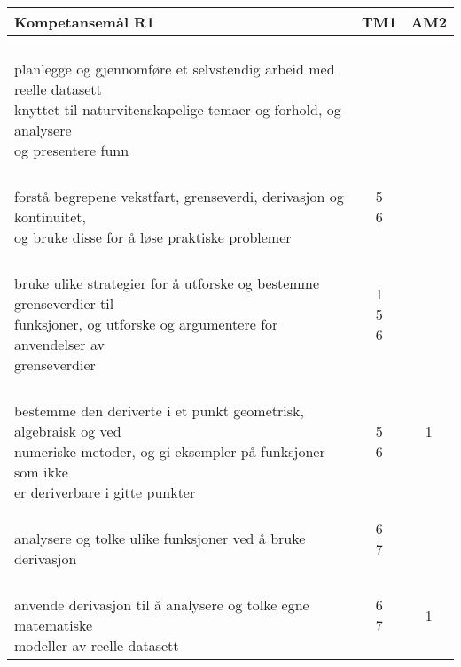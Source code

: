 \documentclass{article}
\begin{document}
\begin{center}
	\begin{tabular}{p{10.5cm} | c | c |} 
		\textbf{Kompetansemål R1} &	\textbf{TM1} &\textbf{AM2} \\ \hline
		\shortstack[l]{\\ planlegge og gjennomføre et selvstendig arbeid med reelle datasett\\ knyttet til naturvitenskapelige temaer og forhold, og analysere\\ og presentere funn
		} &\shortstack{} &\shortstack{} \\ \hline
	
		\shortstack[l]{\\ forstå begrepene vekstfart, grenseverdi, derivasjon og kontinuitet,\\ og bruke disse for å løse praktiske problemer
		} &\shortstack{5\\6} &\shortstack{3} \\ \hline
	
		\shortstack[l]{\\ bruke ulike strategier for å utforske og bestemme grenseverdier til \\funksjoner, og utforske og argumentere for anvendelser av \\grenseverdier
		} &\shortstack{1\\5\\6} &\shortstack{1} \\ \hline		
	

		\shortstack[l]{\\ bestemme den deriverte i et punkt geometrisk, algebraisk og ved \\ numeriske metoder, og gi eksempler på funksjoner som ikke \\ er deriverbare i gitte punkter
		} &\shortstack{5\\6\\{}} &\shortstack{1\\{}\\{}} \\ \hline		
	
		\shortstack[l]{\\ analysere og tolke ulike funksjoner ved å bruke derivasjon \\ \phantom{a}
		} &\shortstack{6\\7} &\shortstack{} \\ \hline	
	
		\shortstack[l]{\\ anvende derivasjon til å analysere og tolke egne matematiske \\modeller av reelle datasett
		} &
		\shortstack{6 \\ 7} &\shortstack{1\\{}} \\ \hline	
		

\end{tabular}
\end{center}
\end{document}
